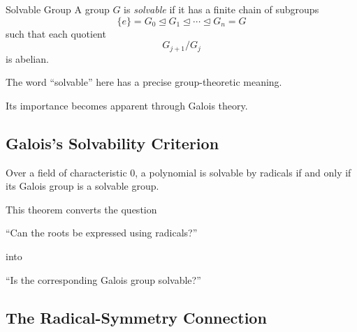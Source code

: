 \begin{definitionbox}{Solvable Group}
A group \(G\) is \emph{solvable} if it has a finite chain of subgroups
\[ \{e\}=G_0\trianglelefteq G_1\trianglelefteq\cdots\trianglelefteq G_n=G \]
such that each quotient
\[ G_{j+1}/G_j \]
is abelian.
\end{definitionbox}

The word ``solvable'' here has a precise group-theoretic meaning.

Its importance becomes apparent through Galois theory.

\subsection{Galois's Solvability Criterion}
\label{subsec:galois-solvability-criterion}

\begin{theorem}
Over a field of characteristic \(0\), a polynomial is solvable by radicals
if and only if its Galois group is a solvable group.
\end{theorem}

This theorem converts the question

\begin{center}
``Can the roots be expressed using radicals?''
\end{center}

into

\begin{center}
``Is the corresponding Galois group solvable?''
\end{center}

\subsection{The Radical-Symmetry Connection}
\label{subsec:radical-symmetry-visual}

\begin{center}
\end{center}

